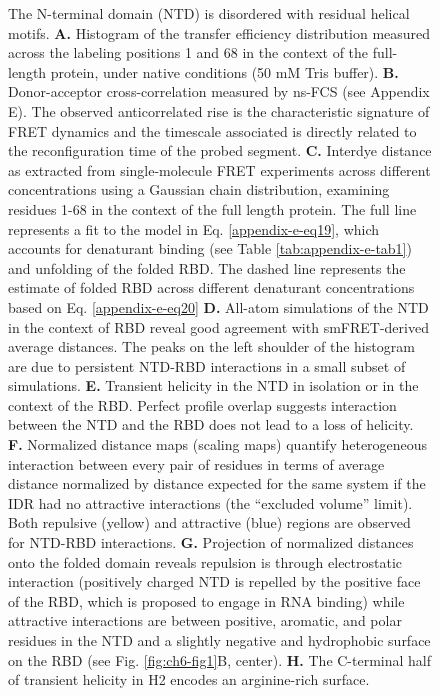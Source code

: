 \documentclass[../main.tex]{subfiles}
\begin{document}
\begin{figure}[!htb]
                {The N-terminal domain (NTD) is disordered with residual helical motifs. \textbf{A.} Histogram of the transfer efficiency distribution measured across the labeling positions 1 and 68 in the context of the full-length protein, under native conditions (50 mM Tris buffer). \textbf{B.} Donor-acceptor cross-correlation measured by ns-FCS (see Appendix E). The observed anticorrelated rise is the characteristic signature of FRET dynamics and the timescale associated is directly related to the reconfiguration time of the probed segment. \textbf{C.} Interdye distance as extracted from single-molecule FRET experiments across different concentrations using a Gaussian chain distribution, examining residues 1-68 in the context of the full length protein. The full line represents a fit to the model in Eq. \ref{appendix-e-eq19}, which accounts for denaturant binding (see Table \ref{tab:appendix-e-tab1}) and unfolding of the folded RBD. The dashed line represents the estimate of folded RBD across different denaturant concentrations based on Eq. \ref{appendix-e-eq20} \textbf{D.} All-atom simulations of the NTD in the context of RBD reveal good agreement with smFRET-derived average distances. The peaks on the left shoulder of the histogram are due to persistent NTD-RBD interactions in a small subset of simulations. \textbf{E.} Transient helicity in the NTD in isolation or in the context of the RBD. Perfect profile overlap suggests interaction between the NTD and the RBD does not lead to a loss of helicity. \textbf{F.} Normalized distance maps (scaling maps) quantify heterogeneous interaction between every pair of residues in terms of average distance normalized by distance expected for the same system if the IDR had no attractive interactions (the “excluded volume” limit\cite{Holehouse2015-rg}). Both repulsive (yellow) and attractive (blue) regions are observed for NTD-RBD interactions. \textbf{G.} Projection of normalized distances onto the folded domain reveals repulsion is through electrostatic interaction (positively charged NTD is repelled by the positive face of the RBD, which is proposed to engage in RNA binding) while attractive interactions are between positive, aromatic, and polar residues in the NTD and a slightly negative and hydrophobic surface on the RBD (see Fig. \ref{fig:ch6-fig1}B, center). \textbf{H.} The C-terminal half of transient helicity in H2 encodes an arginine-rich surface.}
            \label{fig:ch6-fig2}
        \end{figure}
\end{document}
